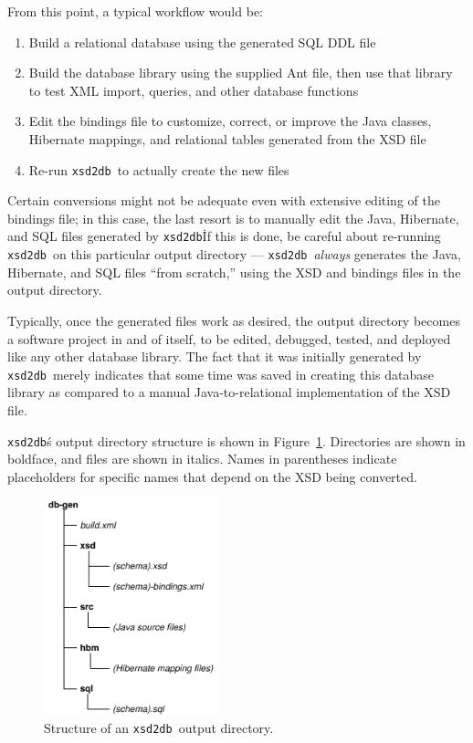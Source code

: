 \documentclass[10pt]{bmc_article}
\newenvironment{bmcformat}{\begin{raggedright}\baselineskip20pt\sloppy\setboolean{publ}{false}}{\end{raggedright}\baselineskip20pt\sloppy}
\def\xsd2db{\texttt{xsd2db}}
\begin{document}
\begin{bmcformat}
\begin{itemize}
\end{itemize}
From this point, a typical workflow would be:
\begin{enumerate}
\item Build a relational database using the generated SQL DDL file
\item Build the database library using the supplied Ant file, then use that library to test XML import, queries, and other database functions
\item Edit the bindings file to customize, correct, or improve the Java classes, Hibernate mappings, and relational tables generated from the XSD file
\item Re-run \xsd2db\ to actually create the new files
\end{enumerate}
Certain conversions might not be adequate even with extensive editing of the bindings file; in this case, the last resort is to manually edit the Java, Hibernate, and SQL files generated by \xsd2db\.  If this is done, be careful about re-running \xsd2db\ on this particular output directory --- \xsd2db\ \emph{always} generates the Java, Hibernate, and SQL files ``from scratch,'' using the XSD and bindings files in the output directory.\pb

Typically, once the generated files work as desired, the output directory becomes a software project in and of itself, to be edited, debugged, tested, and deployed like any other database library.  The fact that it was initially generated by \xsd2db\ merely indicates that some time was saved in creating this database library as compared to a manual Java-to-relational implementation of the XSD file.\pb

\xsd2db\'s output directory structure is shown in Figure~\ref{output}.  Directories are shown in boldface, and files are shown in italics.  Names in parentheses indicate placeholders for specific names that depend on the XSD being converted.\pb

\begin{figure}[htbp] %
   \centering
   \includegraphics[width=2in]{figures/db-gen.pdf} 
   \caption{Structure of an \xsd2db\ output directory.}
   \label{output}
\end{figure}


\end{bmcformat}
\end{document}
